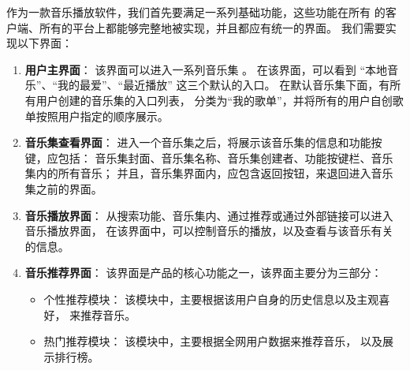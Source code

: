  作为一款音乐播放软件，我们首先要满足一系列基础功能，这些功能在所有
的客户端、所有的平台上都能够完整地被实现，并且都应有统一的界面。
我们需要实现以下界面：
\begin{enumerate}
    \item \textbf{用户主界面}：
    该界面可以进入一系列音乐集 。
        在该界面，可以看到
        ``本地音乐''、``我的最爱''、``最近播放''
        这三个默认的入口。
        在默认音乐集下面，有所有用户创建的音乐集的入口列表，
        分类为``我的歌单''，并将所有的用户自创歌单按照用户指定的顺序展示。
    \item \textbf{音乐集查看界面}：
    进入一个音乐集之后，将展示该音乐集的信息和功能按键，应包括：
    音乐集封面、音乐集名称、音乐集创建者、功能按键栏、音乐集内的所有音乐；
    并且，音乐集界面内，应包含返回按钮，来退回进入音乐集之前的界面。
    \item \textbf{音乐播放界面}：
    从搜索功能、音乐集内、通过推荐或通过外部链接可以进入音乐播放界面，
        在该界面中，可以控制音乐的播放，以及查看与该音乐有关的信息。
    \item \textbf{音乐推荐界面}：
        该界面是产品的核心功能之一，该界面主要分为三部分：
        \begin{itemize}
            \item 个性推荐模块：
                该模块中，主要根据该用户自身的历史信息以及主观喜好，
                来推荐音乐。
            \item 热门推荐模块：
                该模块中，主要根据全网用户数据来推荐音乐，
                以及展示排行榜。
        \end{itemize}
\end{enumerate}
